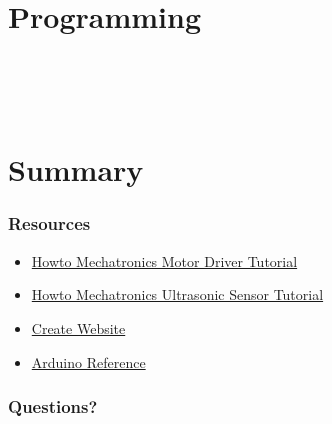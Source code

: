 \documentclass[compress]{beamer}
\begin{document}
\section{Programming}

\begin{frame}[fragile]
    \inputminted[linenos, breaklines, firstline=1, lastline=10]{arduino}{code/workshop.ino}
\end{frame}

\begin{frame}[fragile]
    \inputminted[linenos, breaklines, firstline=11, lastline=24]{arduino}{code/workshop.ino}
\end{frame}

\begin{frame}[fragile]
    \inputminted[linenos, breaklines, firstline=25, lastline=38]{arduino}{code/workshop.ino}
\end{frame}

\begin{frame}[fragile]
    \inputminted[linenos, breaklines, firstline=39, lastline=45]{arduino}{code/workshop.ino}
\end{frame}

\begin{frame}[fragile]
    \inputminted[linenos, breaklines, firstline=46, lastline=61]{arduino}{code/workshop.ino}
\end{frame}

\section{Summary}

\begin{frame}[fragile]
    \frametitle{Resources}
    \begin{itemize}
        \item \href{https://howtomechatronics.com/tutorials/arduino/arduino-dc-motor-control-tutorial-l298n-pwm-h-bridge/}{Howto Mechatronics Motor Driver Tutorial}
        \item \href{https://howtomechatronics.com/tutorials/arduino/ultrasonic-sensor-hc-sr04/}{Howto Mechatronics Ultrasonic Sensor Tutorial}
        \item \href{https://www.createunsw.com.au/}{Create Website}
        \item \href{https://www.arduino.cc/reference/en/}{Arduino Reference}
    \end{itemize}
\end{frame}

\begin{frame}[fragile]
    \frametitle{Questions?}
\end{frame}
\end{document}
